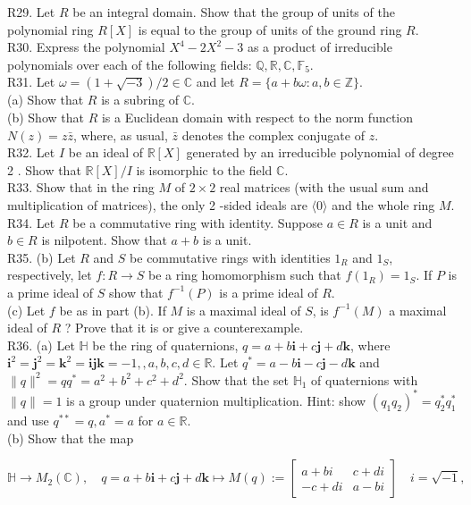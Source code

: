 R29. Let $R$ be an integral domain. Show that the group of units of the polynomial ring $R[X]$ is equal to the group of units of the ground ring $R$.\\
R30. Express the polynomial $X^{4}-2 X^{2}-3$ as a product of irreducible polynomials over each of the following fields: $\mathbb{Q}, \mathbb{R}, \mathbb{C}, \mathbb{F}_{5}$.\\
R31. Let $\omega=(1+\sqrt{-3}) / 2 \in \mathbb{C}$ and let $R=\{a+b \omega: a, b \in \mathbb{Z}\}$.\\
(a) Show that $R$ is a subring of $\mathbb{C}$.\\
(b) Show that $R$ is a Euclidean domain with respect to the norm function $N(z)=z \bar{z}$, where, as usual, $\bar{z}$ denotes the complex conjugate of $z$.\\
R32. Let $I$ be an ideal of $\mathbb{R}[X]$ generated by an irreducible polynomial of degree 2 . Show that $\mathbb{R}[X] / I$ is isomorphic to the field $\mathbb{C}$.\\
R33. Show that in the ring $M$ of $2 \times 2$ real matrices (with the usual sum and multiplication of matrices), the only 2 -sided ideals are $\langle 0\rangle$ and the whole ring $M$.\\
R34. Let $R$ be a commutative ring with identity. Suppose $a \in R$ is a unit and $b \in R$ is nilpotent. Show that $a+b$ is a unit.\\
R35. (b) Let $R$ and $S$ be commutative rings with identities $1_{R}$ and $1_{S}$, respectively, let $f: R \rightarrow S$ be a ring homomorphism such that $f\left(1_{R}\right)=1_{S}$. If $P$ is a prime ideal of $S$ show that $f^{-1}(P)$ is a prime ideal of $R$.\\
(c) Let $f$ be as in part (b). If $M$ is a maximal ideal of $S$, is $f^{-1}(M)$ a maximal ideal of $R$ ? Prove that it is or give a counterexample.\\
R36. (a) Let $\mathbb{H}$ be the ring of quaternions, $q=a+b \mathbf{i}+c \mathbf{j}+d \mathbf{k}$, where $\mathbf{i}^{2}=\mathbf{j}^{2}=\mathbf{k}^{2}=\mathbf{i j k}=-1,, a, b, c, d \in \mathbb{R}$. Let $q^{*}=a-b \mathbf{i}-c \mathbf{j}-d \mathbf{k}$ and $\|q\|^{2}=q q^{*}=a^{2}+b^{2}+c^{2}+d^{2}$. Show that the set $\mathbb{H}_{1}$ of quaternions with $\|q\|=1$ is a group under quaternion multiplication. Hint: show $\left(q_{1} q_{2}\right)^{*}=q_{2}^{*} q_{1}^{*}$ and use $q^{* *}=q, a^{*}=a$ for $a \in \mathbb{R}$.\\
(b) Show that the map

$$
\mathbb{H} \rightarrow M_{2}(\mathbb{C}), \quad q=a+b \mathbf{i}+c \mathbf{j}+d \mathbf{k} \mapsto M(q):=\left[\begin{array}{cc}
	a+b i & c+d i \\
	-c+d i & a-b i
\end{array}\right] \quad i=\sqrt{-1},
$$

